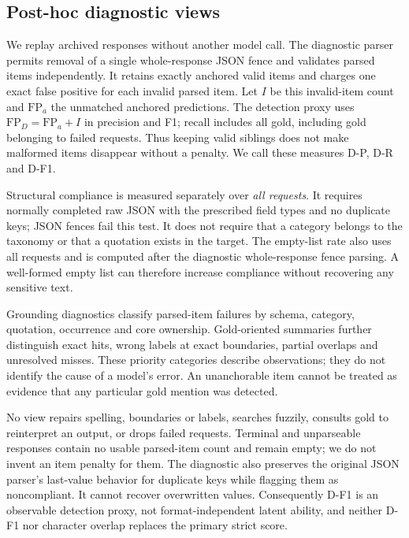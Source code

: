 \subsection{Post-hoc diagnostic views}
We replay archived responses without another model call. The diagnostic
parser permits removal of a single whole-response JSON fence and validates
parsed items independently. It retains exactly anchored valid items and
charges one exact false positive for each invalid parsed item. Let $I$ be
this invalid-item count and $\mathrm{FP}_a$ the unmatched anchored predictions.
The detection proxy uses $\mathrm{FP}_D=\mathrm{FP}_a+I$ in precision and
F1; recall includes all gold, including gold belonging to failed requests.
Thus keeping valid siblings does not make malformed items disappear without
a penalty. We call these measures D-P, D-R and D-F1.

Structural compliance is measured separately over \emph{all requests}.
It requires normally completed raw JSON with the prescribed field types
and no duplicate keys; JSON fences fail this test. It does not require
that a category belongs to the taxonomy or that a quotation exists in the
target. The empty-list rate also uses all requests and is computed after
the diagnostic whole-response fence parsing. A well-formed empty list can
therefore increase compliance without recovering any sensitive text.

Grounding diagnostics classify parsed-item failures by schema, category,
quotation, occurrence and core ownership. Gold-oriented summaries further
distinguish exact hits, wrong labels at exact boundaries, partial overlaps
and unresolved misses. These priority categories describe observations;
they do not identify the cause of a model's error. An unanchorable item
cannot be treated as evidence that any particular gold mention was detected.

No view repairs spelling, boundaries or labels, searches fuzzily, consults
gold to reinterpret an output, or drops failed requests. Terminal and
unparseable responses contain no usable parsed-item count and remain empty;
we do not invent an item penalty for them. The diagnostic also preserves
the original JSON parser's last-value behavior for duplicate keys while
flagging them as noncompliant. It cannot recover overwritten values.
Consequently D-F1 is an observable detection proxy, not format-independent
latent ability, and neither D-F1 nor character overlap replaces the primary
strict score.
